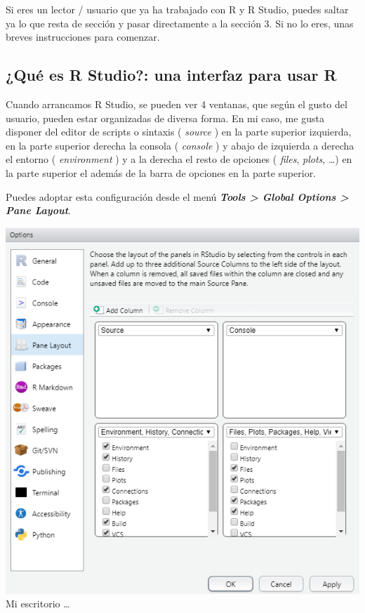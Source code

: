 \documentclass[
]{book}
\begin{document}
Si eres un lector / usuario que ya ha trabajado con R y R Studio, puedes saltar ya lo que resta de sección y pasar directamente a la sección 3. Si no lo eres, unas breves instrucciones para comenzar.

\hypertarget{quuxe9-es-r-studio-una-interfaz-para-usar-r}{%
\subsection{¿Qué es R Studio?: una interfaz para usar R}\label{quuxe9-es-r-studio-una-interfaz-para-usar-r}}

Cuando arrancamos R Studio, se pueden ver 4 ventanas, que según el gusto del usuario, pueden estar organizadas de diversa forma. En mi caso, me gusta disponer del editor de scripts o sintaxis ( \emph{source} ) en la parte superior izquierda, en la parte superior derecha la consola ( \emph{console} ) y abajo de izquierda a derecha el entorno ( \emph{environment} ) y a la derecha el resto de opciones ( \emph{files}, \emph{plots}, \ldots) en la parte superior el además de la barra de opciones en la parte superior.

Puedes adoptar esta configuración desde el menú \textbf{\emph{Tools \textgreater{} Global Options \textgreater{} Pane Layout}}.

\includegraphics{data/RS01.png}
Mi escritorio \ldots{}
\end{document}
